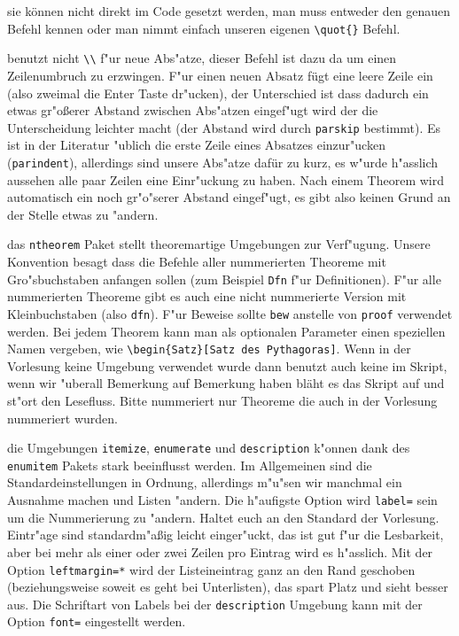\documentclass[paper=A4, twoside, chapterprefix=true, bibliography=totoc, headsepline]{scrbook}
\begin{document}
\begin{description}[font=\normalfont\itshape]
\item[Anf"uhrungszeichen:]
	sie können nicht direkt im Code gesetzt werden, man muss entweder den genauen Befehl kennen oder man nimmt einfach unseren eigenen \verb|\quot{}| Befehl.
\item[Abs"atze:]
	benutzt nicht \verb|\\| f"ur neue Abs"atze, dieser Befehl ist dazu da um einen Zeilenumbruch zu erzwingen. F"ur einen neuen Absatz fügt eine leere Zeile ein (also zweimal die Enter Taste dr"ucken), der Unterschied ist dass dadurch ein etwas gr"o\ss erer Abstand zwischen Abs"atzen eingef"ugt wird der die Unterscheidung leichter macht (der Abstand wird durch \verb|parskip| bestimmt). Es ist in der Literatur "ublich die erste Zeile eines Absatzes einzur"ucken (\verb|parindent|), allerdings sind unsere Abs"atze dafür zu kurz, es w"urde h"asslich aussehen alle paar Zeilen eine Einr"uckung zu haben. Nach einem Theorem wird automatisch ein noch gr"o"serer Abstand eingef"ugt, es gibt also keinen Grund an der Stelle etwas zu "andern.
\item[Theoreme:]
	das \verb|ntheorem| Paket stellt theoremartige Umgebungen zur Verf"ugung. Unsere Konvention besagt dass die Befehle aller nummerierten Theoreme mit Gro"sbuchstaben anfangen sollen (zum Beispiel \verb|Dfn| f"ur Definitionen). F"ur alle nummerierten Theoreme gibt es auch eine nicht nummerierte Version mit Kleinbuchstaben (also \verb|dfn|). F"ur Beweise sollte \verb|bew| anstelle von \verb|proof| verwendet werden. Bei jedem Theorem kann man als optionalen Parameter einen speziellen Namen vergeben, wie \verb|\begin{Satz}[Satz des Pythagoras]|. Wenn in der Vorlesung keine Umgebung verwendet wurde dann benutzt auch keine im Skript, wenn wir "uberall Bemerkung auf Bemerkung haben bläht es das Skript auf und st"ort den Lesefluss. Bitte nummeriert nur Theoreme die auch in der Vorlesung nummeriert wurden.
\item[Listen und Aufz"ahlungen:]
	die Umgebungen \verb|itemize|, \verb|enumerate| und \verb|description| k"onnen dank des \verb|enumitem| Pakets stark beeinflusst werden. Im Allgemeinen sind die Standardeinstellungen in Ordnung, allerdings m"u"sen wir manchmal ein Ausnahme machen und Listen "andern. Die h"aufigste Option wird \verb|label=| sein um die Nummerierung zu "andern. Haltet euch an den Standard der Vorlesung. Eintr"age sind standardm"a\ss ig leicht einger"uckt, das ist gut f"ur die Lesbarkeit, aber bei mehr als einer oder zwei Zeilen pro Eintrag wird es h"asslich. Mit der Option \verb|leftmargin=*| wird der Listeineintrag ganz an den Rand geschoben (beziehungsweise soweit es geht bei Unterlisten), das spart Platz und sieht besser aus. Die Schriftart von Labels bei der \verb|description| Umgebung kann mit der Option \verb|font=| eingestellt werden.

\end{description}
\end{document}
